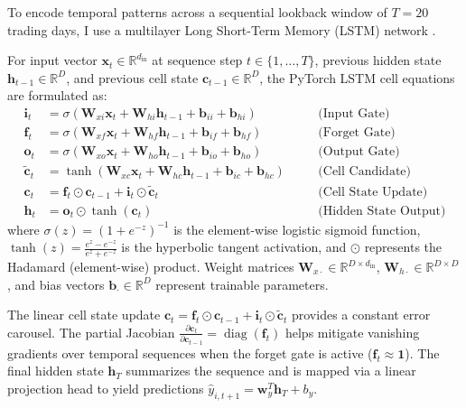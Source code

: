 To encode temporal patterns across a sequential lookback window of $T = 20$ trading days, I use a multilayer Long Short-Term Memory (LSTM) network \citep{hochreiter1997long}.

For input vector $\mathbf{x}_t \in \mathbb{R}^{d_{\text{in}}}$ at sequence step $t \in \{1, \dots, T\}$, previous hidden state $\mathbf{h}_{t-1} \in \mathbb{R}^D$, and previous cell state $\mathbf{c}_{t-1} \in \mathbb{R}^D$, the PyTorch LSTM cell equations are formulated as:
\begin{align}
\mathbf{i}_t &= \sigma\left( \mathbf{W}_{xi} \mathbf{x}_t + \mathbf{W}_{hi} \mathbf{h}_{t-1} + \mathbf{b}_{ii} + \mathbf{b}_{hi} \right) \quad &&\text{(Input Gate)} \label{eq:ch4_lstm_input_gate} \\
\mathbf{f}_t &= \sigma\left( \mathbf{W}_{xf} \mathbf{x}_t + \mathbf{W}_{hf} \mathbf{h}_{t-1} + \mathbf{b}_{if} + \mathbf{b}_{hf} \right) \quad &&\text{(Forget Gate)} \label{eq:ch4_lstm_forget_gate} \\
\mathbf{o}_t &= \sigma\left( \mathbf{W}_{xo} \mathbf{x}_t + \mathbf{W}_{ho} \mathbf{h}_{t-1} + \mathbf{b}_{io} + \mathbf{b}_{ho} \right) \quad &&\text{(Output Gate)} \label{eq:ch4_lstm_output_gate} \\
\tilde{\mathbf{c}}_t &= \tanh\left( \mathbf{W}_{xc} \mathbf{x}_t + \mathbf{W}_{hc} \mathbf{h}_{t-1} + \mathbf{b}_{ic} + \mathbf{b}_{hc} \right) \quad &&\text{(Cell Candidate)} \label{eq:ch4_lstm_cell_cand} \\
\mathbf{c}_t &= \mathbf{f}_t \odot \mathbf{c}_{t-1} + \mathbf{i}_t \odot \tilde{\mathbf{c}}_t \quad &&\text{(Cell State Update)} \label{eq:ch4_lstm_cell_update} \\
\mathbf{h}_t &= \mathbf{o}_t \odot \tanh(\mathbf{c}_t) \quad &&\text{(Hidden State Output)} \label{eq:ch4_lstm_hidden_update}
\end{align}
where $\sigma(z) = (1 + e^{-z})^{-1}$ is the element-wise logistic sigmoid function, $\tanh(z) = \frac{e^z - e^{-z}}{e^z + e^{-z}}$ is the hyperbolic tangent activation, and $\odot$ represents the Hadamard (element-wise) product. Weight matrices $\mathbf{W}_{x\cdot} \in \mathbb{R}^{D \times d_{\text{in}}}$, $\mathbf{W}_{h\cdot} \in \mathbb{R}^{D \times D}$, and bias vectors $\mathbf{b}_{\cdot} \in \mathbb{R}^D$ represent trainable parameters.

The linear cell state update $\mathbf{c}_t = \mathbf{f}_t \odot \mathbf{c}_{t-1} + \mathbf{i}_t \odot \tilde{\mathbf{c}}_t$ provides a constant error carousel. The partial Jacobian $\frac{\partial \mathbf{c}_t}{\partial \mathbf{c}_{t-1}} = \operatorname{diag}(\mathbf{f}_t)$ helps mitigate vanishing gradients over temporal sequences when the forget gate is active ($\mathbf{f}_t \approx \mathbf{1}$). The final hidden state $\mathbf{h}_T$ summarizes the sequence and is mapped via a linear projection head to yield predictions $\hat{y}_{i, t+1} = \mathbf{w}_y^T \mathbf{h}_T + b_y$.

